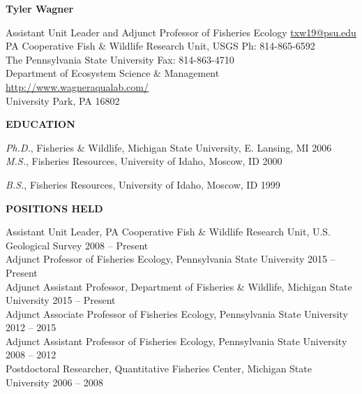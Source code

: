 \documentclass[10pt]{article}
\begin{document}
\centerline {\bf{\Large Tyler Wagner}}
\vspace{8pt}
\begin{flushleft}
Assistant Unit Leader and Adjunct Professor of Fisheries Ecology \hfill \href{mailto:txw19@psu.edu}{txw19@psu.edu}\\
PA Cooperative Fish \& Wildlife Research Unit, USGS \hfill Ph: 814-865-6592\\
 The Pennsylvania State University  \hfill Fax: 814-863-4710\\
 Department of Ecosystem Science \& Management \hfill  \url{http://www.wagneraqualab.com/}\\
University Park, PA 16802\\


\vspace{8pt}

\centerline {\bf{EDUCATION}}

\vspace{5pt}
{\sl Ph.D.}, 
Fisheries \& Wildlife, 
Michigan State University, E. Lansing, MI \hfill 2006 \\ 
\vspace{5pt}
{\sl M.S.}, Fisheries Resources,
University of Idaho, Moscow, ID \hfill 2000

\vspace{5pt}

{\sl B.S.}, Fisheries Resources,
University of Idaho, Moscow, ID \hfill 1999

\vspace{8pt}
\centerline {\bf{POSITIONS HELD}}
\vspace{5pt}
Assistant Unit Leader, PA Cooperative Fish \& Wildlife Research Unit, U.S. Geological Survey \hfill 2008 -- Present \\
Adjunct Professor of Fisheries Ecology, Pennsylvania State University  \hfill 2015 -- Present \\
Adjunct Assistant Professor, Department of Fisheries \& Wildlife, Michigan State University \hfill 2015 -- Present \\
Adjunct Associate Professor of Fisheries Ecology, Pennsylvania State University  \hfill 2012 -- 2015 \\
Adjunct Assistant Professor of Fisheries Ecology, Pennsylvania State University  \hfill 2008 -- 2012 \\
Postdoctoral Researcher, Quantitative Fisheries Center, Michigan State University \hfill 2006 -- 2008 \\


\end{flushleft}
\end{document}
